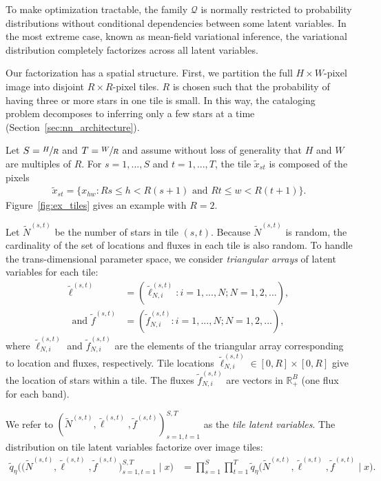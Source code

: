 To make optimization tractable, the family $\mathcal{Q}$ is normally restricted to probability distributions
without conditional dependencies between some latent variables. In the most extreme case, known as mean-field variational inference, the variational distribution completely factorizes across all latent variables.

Our factorization has a spatial structure.
First, we partition the full $H \times W$-pixel image into disjoint $R \times R$-pixel tiles.
$R$ is chosen such that the probability of having three or more stars in one tile is small.
In this way, the cataloging problem decomposes to inferring only a few stars at a time (Section~\ref{sec:nn_architecture}).


Let $S = \sfrac{H}{R}$ and $T = \sfrac{W}{R}$ and assume without loss of generality that $H$ and $W$ are multiples of $R$.
For $s = 1, ..., S$ and $t = 1, ..., T$,
the tile $\tilde x_{st}$ is composed of the pixels
\begin{align}
    \tilde x_{st} = \{x_{hw} : Rs \leq h < R(s+1) \text{ and } Rt \leq w < R(t+1)\}.
    \label{eq:tiles}
\end{align}
Figure~\ref{fig:ex_tiles} gives an example with $R = 2$.

Let $\tilde N^{(s, t)}$ be the number of stars in tile $(s,t)$.
Because $\tilde N^{(s, t)}$ is random,
the cardinality of the set of locations and fluxes in each tile
is also random.
To handle the trans-dimensional parameter space,
we consider {\itshape triangular arrays} of latent variables
for each tile:
\begin{align}
    \tilde\ell^{(s, t)} &= (\tilde\ell_{N, i}^{(s, t)} : i = 1, ..., N; N = 1, 2, ...), \\
    \text{ and } \tilde f^{(s, t)} &= (\tilde f_{N, i}^{(s, t)} : i = 1, ..., N; N = 1, 2, ...),
\end{align}
where $\tilde\ell_{N, i}^{(s, t)}$ and $\tilde f_{N, i}^{(s, t)}$ are the elements of the triangular array corresponding to location and fluxes, respectively.
Tile locations $\tilde\ell_{N, i}^{(s, t)} \in [0, R]\times[0, R]$ give the location of stars within a tile. The fluxes $\tilde f_{N, i}^{(s, t)}$ are vectors in $\mathbb{R}^B_+$ (one flux for each band).

We refer to $(\tilde N^{(s, t)}, \tilde \ell^{(s, t)}, \tilde f^{(s, t)})_{s=1,t=1}^{S,T}$ as the {\itshape tile latent variables}. The distribution on tile latent variables factorize over image tiles:
\begin{align}
    \tilde q_\eta\big( \big(\tilde N^{(s, t)}, \tilde \ell^{(s, t)}, \tilde f^{(s, t)}\big)_{s=1, t = 1}^{S, T} \mid x\big)
    &=
    \prod_{s = 1}^S \prod_{t=1}^T
    \tilde q_\eta\big(\tilde N^{(s, t)}, \tilde \ell^{(s, t)}, \tilde f^{(s, t)} \mid x\big).
    \label{eq:factorize_patches}
\end{align}

